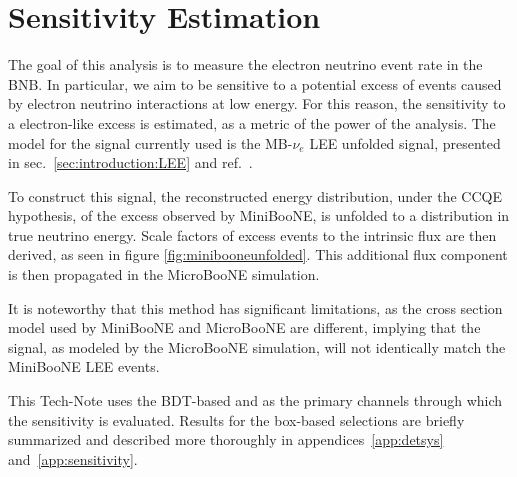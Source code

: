 \section{Sensitivity Estimation }
\label{sec:sensitivity}

The goal of this analysis is to measure the electron neutrino event rate in the BNB. In particular, we aim to be sensitive to a potential excess of events caused by electron neutrino interactions at low energy.
For this reason, the sensitivity to a \nue electron-like excess is estimated, as a metric of the power of the analysis.
The model for the signal currently used is the MB-$\nu_e$ LEE unfolded signal, presented in sec.~\ref{sec:introduction:LEE} and ref.~\cite{C2}.

To construct this signal, the reconstructed energy distribution, under the CCQE hypothesis, of the excess observed by MiniBooNE, is unfolded to a distribution in true neutrino energy.
Scale factors of excess events to the intrinsic \nue flux are then derived, as seen in figure \ref{fig:minibooneunfolded}.
This additional flux component is then propagated in the MicroBooNE simulation.

It is noteworthy that this method has significant limitations, as the cross section model used by MiniBooNE and MicroBooNE are different, implying that the signal, as modeled by the MicroBooNE simulation, will not identically match the MiniBooNE LEE events.

This Tech-Note uses the BDT-based \npsel and \zpsel as the primary channels through which the sensitivity is evaluated. Results for the box-based selections are briefly summarized and described more thoroughly in appendices~\ref{app:detsys} and~\ref{app:sensitivity}.




